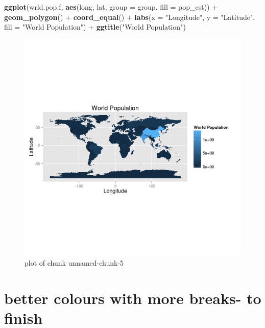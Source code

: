 \documentclass[]{article}
\makeatletter
\newenvironment{Shaded}{}{}
\newcommand{\KeywordTok}[1]{\textcolor[rgb]{0.00,0.44,0.13}{\textbf{{#1}}}}
\newcommand{\DataTypeTok}[1]{\textcolor[rgb]{0.56,0.13,0.00}{{#1}}}
\newcommand{\StringTok}[1]{\textcolor[rgb]{0.25,0.44,0.63}{{#1}}}
\newcommand{\NormalTok}[1]{{#1}}
\def\maxwidth{\ifdim\Gin@nat@width>\linewidth\linewidth
\else\Gin@nat@width\fi}
\let\Oldincludegraphics\includegraphics
\renewcommand{\includegraphics}[1]{\Oldincludegraphics[width=\maxwidth]{#1}}
\makeatother
\begin{document}
\begin{Shaded}
\begin{Highlighting}[]
\KeywordTok{ggplot}\NormalTok{(wrld.pop.f, }\KeywordTok{aes}\NormalTok{(long, lat, }\DataTypeTok{group =} \NormalTok{group, }\DataTypeTok{fill =} \NormalTok{pop_est)) +}\StringTok{ }\KeywordTok{geom_polygon}\NormalTok{() +}\StringTok{ }
\StringTok{    }\KeywordTok{coord_equal}\NormalTok{() +}\StringTok{ }\KeywordTok{labs}\NormalTok{(}\DataTypeTok{x =} \StringTok{"Longitude"}\NormalTok{, }\DataTypeTok{y =} \StringTok{"Latitude"}\NormalTok{, }\DataTypeTok{fill =} \StringTok{"World Population"}\NormalTok{) +}\StringTok{ }
\StringTok{    }\KeywordTok{ggtitle}\NormalTok{(}\StringTok{"World Population"}\NormalTok{)}
\end{Highlighting}
\end{Shaded}

\begin{figure}[htbp]
\centering
\includegraphics{figure/unnamed-chunk-5.png}
\caption{plot of chunk unnamed-chunk-5}
\end{figure}

\section{better colours with more breaks- to finish}
\end{document}
